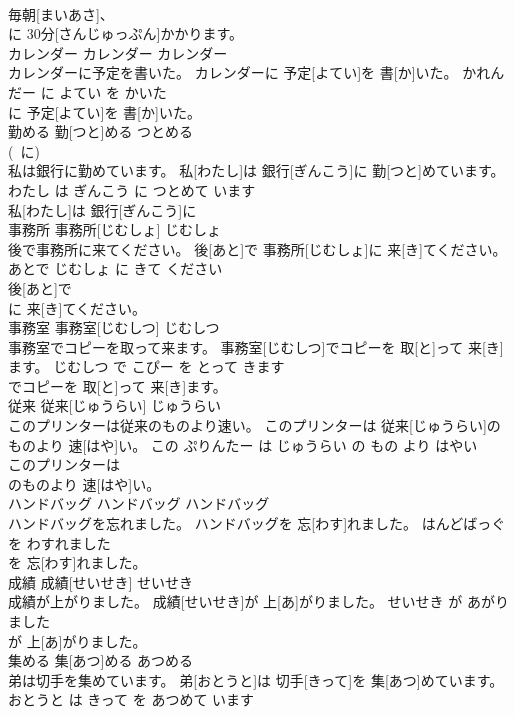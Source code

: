 \documentclass[8pt]{extreport}
\begin{document}
\begin{CJK}{UTF8}{min}
\\	毎朝[まいあさ]、
\\	に 30分[さんじゅっぷん]かかります。		
\\	カレンダー	カレンダー	カレンダー	
\\	カレンダーに予定を書いた。	カレンダーに 予定[よてい]を 書[か]いた。	かれんだー に よてい を かいた	
\\	に 予定[よてい]を 書[か]いた。		
\\	勤める	勤[つと]める	つとめる	
\\	(~に)		
\\	私は銀行に勤めています。	私[わたし]は 銀行[ぎんこう]に 勤[つと]めています。	わたし は ぎんこう に つとめて います	
\\	私[わたし]は 銀行[ぎんこう]に
\\	事務所	事務所[じむしょ]	じむしょ	
\\	後で事務所に来てください。	後[あと]で 事務所[じむしょ]に 来[き]てください。	あとで じむしょ に きて ください	
\\	後[あと]で
\\	に 来[き]てください。		
\\	事務室	事務室[じむしつ]	じむしつ	
\\	事務室でコピーを取って来ます。	事務室[じむしつ]でコピーを 取[と]って 来[き]ます。	じむしつ で こぴー を とって きます	
\\	でコピーを 取[と]って 来[き]ます。		
\\	従来	従来[じゅうらい]	じゅうらい	
\\	このプリンターは従来のものより速い。	このプリンターは 従来[じゅうらい]のものより 速[はや]い。	この ぷりんたー は じゅうらい の もの より はやい	
\\	このプリンターは
\\	のものより 速[はや]い。		
\\	ハンドバッグ	ハンドバッグ	ハンドバッグ	
\\	ハンドバッグを忘れました。	ハンドバッグを 忘[わす]れました。	はんどばっぐ を わすれました	
\\	を 忘[わす]れました。		
\\	成績	成績[せいせき]	せいせき	
\\	成績が上がりました。	成績[せいせき]が 上[あ]がりました。	せいせき が あがりました	
\\	が 上[あ]がりました。		
\\	集める	集[あつ]める	あつめる	
\\	弟は切手を集めています。	弟[おとうと]は 切手[きって]を 集[あつ]めています。	おとうと は きって を あつめて います	

\end{CJK}
\end{document}
